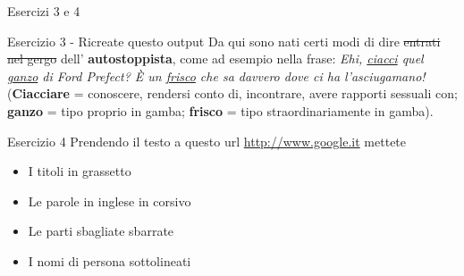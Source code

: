 \begin{frame}{Esercizi 3 e 4}

\begin{block}{Esercizio 3 - Ricreate questo output}
Da qui sono nati certi modi di dire \sout{entrati nel gergo} dell'
\textbf{autostoppista}, come ad esempio nella frase: \textit{Ehi, 
\underline{ciacci} quel \underline{ganzo} di Ford Prefect? È un
\underline{frisco} che sa davvero dove ci ha l’asciugamano!} (\textbf{Ciacciare}
 = conoscere, rendersi conto di, incontrare, avere rapporti sessuali con; 
\textbf{ganzo} = tipo proprio in gamba; \textbf{frisco} = tipo
straordinariamente in gamba).
\end{block}

\begin{block}{Esercizio 4}
	Prendendo il testo a questo url \url{http://www.google.it} mettete
	\begin{itemize}
	\item I titoli in grassetto
	\item Le parole in inglese in corsivo
	\item Le parti sbagliate sbarrate
	\item I nomi di persona sottolineati
	\end{itemize}
\end{block}

\end{frame}
